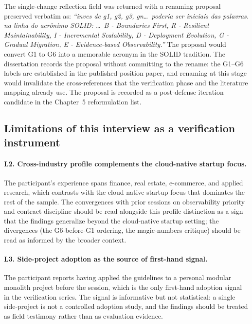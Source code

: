 The single-change reflection field was returned with a renaming proposal preserved verbatim as: \emph{``inves de g1, g2, g3, gn\ldots\ poderia ser iniciais das palavras. na linha do acr\^onimo SOLID: \ldots\ B - Boundaries First, R - Resilient Maintainability, I - Incremental Scalability, D - Deployment Evolution, G - Gradual Migration, E - Evidence-based Observability.''} The proposal would convert G1 to G6 into a memorable acronym in the SOLID tradition. The dissertation records the proposal without committing to the rename: the G1--G6 labels are established in the published position paper, and renaming at this stage would invalidate the cross-references that the verification phase and the literature mapping already use. The proposal is recorded as a post-defense iteration candidate in the Chapter~5 reformulation list.

\subsection*{Limitations of this interview as a verification instrument}

\paragraph*{L2. Cross-industry profile complements the cloud-native startup focus.} The participant's experience spans finance, real estate, e-commerce, and applied research, which contrasts with the cloud-native startup focus that dominates the rest of the sample. The convergences with prior sessions on observability priority and contract discipline should be read alongside this profile distinction as a sign that the findings generalize beyond the cloud-native startup setting; the divergences (the G6-before-G1 ordering, the magic-numbers critique) should be read as informed by the broader context.

\paragraph*{L3. Side-project adoption as the source of first-hand signal.} The participant reports having applied the guidelines to a personal modular monolith project before the session, which is the only first-hand adoption signal in the verification series. The signal is informative but not statistical: a single side-project is not a controlled adoption study, and the findings should be treated as field testimony rather than as evaluation evidence.

